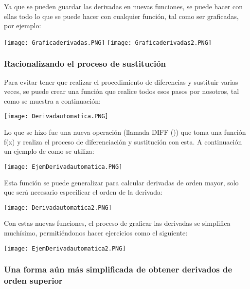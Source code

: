 \documentclass{article}
\begin{document}
Ya que se pueden guardar las derivadas en nuevas funciones, se puede hacer con ellas todo lo que se puede hacer con cualquier función, tal como ser graficadas, por ejemplo:

\begin{center}
\texttt{[image: Graficaderivadas.PNG]}
\texttt{[image: Graficaderivadas2.PNG]}
\end{center}

\subsubsection{Racionalizando el proceso de sustitución}

Para evitar tener que realizar el procedimiento de diferencias y sustituir varias veces, se puede crear una función que realice todos esos pasos por nosotros, tal como se muestra a continuación:

\begin{center}
\texttt{[image: Derivadautomatica.PNG]}
\end{center}

Lo que se hizo fue una nueva operación (llamada DIFF ()) que toma una función f(x) y realiza el proceso de diferenciación y sustitución con esta. A continuación un ejemplo de como se utiliza:

\begin{center}
\texttt{[image: EjemDerivadautomatica.PNG]}
\end{center}

Esta función se puede generalizar para calcular derivadas de orden mayor, solo que será necesario especificar el orden de la derivada:

\begin{center}
\texttt{[image: Derivadautomatica2.PNG]}
\end{center}

Con estas nuevas funciones, el proceso de graficar las derivadas se simplifica muchísimo, permitiéndonos hacer ejercicios como el siguiente:

\begin{center}
\texttt{[image: EjemDerivadautomatica2.PNG]}
\end{center}

\subsubsection{Una forma aún más simplificada de obtener derivados de orden superior}
\end{document}
